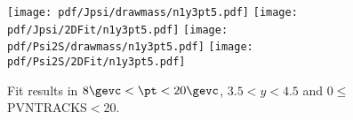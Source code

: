 \begin{figure}[H]
\begin{center}
\texttt{[image: pdf/Jpsi/drawmass/n1y3pt5.pdf]}
\texttt{[image: pdf/Jpsi/2DFit/n1y3pt5.pdf]}
\vspace*{-0.5cm}
\texttt{[image: pdf/Psi2S/drawmass/n1y3pt5.pdf]}
\texttt{[image: pdf/Psi2S/2DFit/n1y3pt5.pdf]}
\vspace*{-0.5cm}
\end{center}
\caption{Fit results in $8\gevc<\pt<20\gevc$, $3.5<y<4.5$ and 0$\leq$PVNTRACKS$<$20.}
\label{Fitn1y3pt5}
\end{figure}

